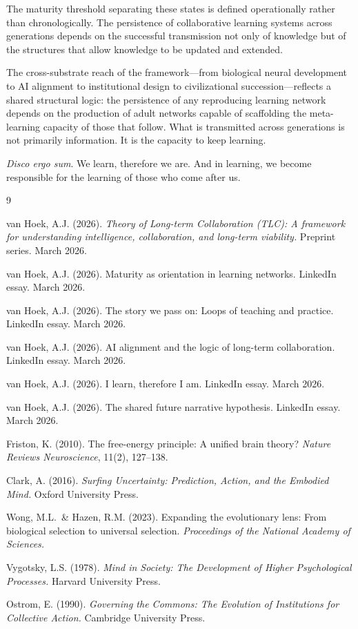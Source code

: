 \documentclass[11pt]{article}
\begin{document}
The maturity threshold separating these states is defined operationally rather than
chronologically. The persistence of collaborative learning systems across generations depends
on the successful transmission not only of knowledge but of the structures that allow knowledge
to be updated and extended.

The cross-substrate reach of the framework---from biological neural development to AI alignment
to institutional design to civilizational succession---reflects a shared structural logic: the
persistence of any reproducing learning network depends on the production of adult networks
capable of scaffolding the meta-learning capacity of those that follow. What is transmitted
across generations is not primarily information. It is the capacity to keep learning.

\medskip
\noindent\textit{Disco ergo sum}. We learn, therefore we are. And in learning, we become
responsible for the learning of those who come after us.

\begin{thebibliography}{9}

van Hoek, A.J. (2026).
\textit{Theory of Long-term Collaboration (TLC): A framework for understanding intelligence, collaboration, and long-term viability.}
Preprint series. March 2026.

van Hoek, A.J. (2026).
Maturity as orientation in learning networks.
LinkedIn essay. March 2026.

van Hoek, A.J. (2026).
The story we pass on: Loops of teaching and practice.
LinkedIn essay. March 2026.

van Hoek, A.J. (2026).
AI alignment and the logic of long-term collaboration.
LinkedIn essay. March 2026.

van Hoek, A.J. (2026).
I learn, therefore I am.
LinkedIn essay. March 2026.

van Hoek, A.J. (2026).
The shared future narrative hypothesis.
LinkedIn essay. March 2026.

Friston, K. (2010).
The free-energy principle: A unified brain theory?
\textit{Nature Reviews Neuroscience}, 11(2), 127--138.

Clark, A. (2016).
\textit{Surfing Uncertainty: Prediction, Action, and the Embodied Mind.}
Oxford University Press.

Wong, M.L.\ \& Hazen, R.M. (2023).
Expanding the evolutionary lens: From biological selection to universal selection.
\textit{Proceedings of the National Academy of Sciences.}

Vygotsky, L.S. (1978).
\textit{Mind in Society: The Development of Higher Psychological Processes.}
Harvard University Press.

Ostrom, E. (1990).
\textit{Governing the Commons: The Evolution of Institutions for Collective Action.}
Cambridge University Press.

\end{thebibliography}
\end{document}
